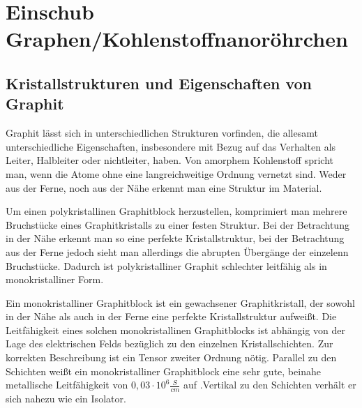 \documentclass[12pt,a4paper]{report}%
\let\harvardleftorig\harvardleft
\numberwithin{equation}{section}
\newcommand\citevgl
{\def\harvardleft{(vgl.\ \global\let\harvardleft\harvardleftorig}%
 \cite
}
\numberwithin{equation}{subsection}
\begin{document}
	\section{Einschub Graphen/Kohlenstoffnanoröhrchen}
	\subsection{Kristallstrukturen und Eigenschaften von Graphit}
    Graphit lässt sich in unterschiedlichen Strukturen vorfinden, die allesamt unterschiedliche Eigenschaften, insbesondere mit Bezug auf das Verhalten als Leiter, Halbleiter oder nichtleiter, haben. 
    Von amorphem Kohlenstoff spricht man, wenn die Atome ohne eine langreichweitige Ordnung vernetzt sind. Weder aus der Ferne, noch aus der Nähe erkennt man eine Struktur im Material. \newline
    
    Um einen polykristallinen Graphitblock herzustellen, komprimiert man mehrere Bruchstücke eines Graphitkristalls zu einer festen Struktur. Bei der Betrachtung in der Nähe erkennt man so eine perfekte Kristallstruktur, bei der Betrachtung aus der Ferne jedoch sieht man allerdings die abrupten Übergänge der einzelenn Bruchstücke. Dadurch ist polykristalliner Graphit schlechter leitfähig als in monokristalliner Form.\newline
    
    Ein monokristalliner Graphitblock ist ein gewachsener Graphitkristall, der sowohl in  der Nähe als auch in der Ferne eine perfekte Kristallstruktur aufweißt. Die Leitfähigkeit eines solchen monokristallinen Graphitblocks ist abhängig von der Lage des elektrischen Felds bezüglich zu den einzelnen Kristallschichten. Zur korrekten Beschreibung ist ein Tensor zweiter Ordnung nötig. Parallel zu den Schichten weißt ein monokristalliner Graphitblock eine sehr gute, beinahe metallische Leitfähigkeit von $0,03\cdot 10^6 \frac{S}{cm}$ auf \citevgl{Weinschenk1898Graphitseine}.Vertikal zu den Schichten verhält er sich nahezu wie ein Isolator.
    
\end{document}
